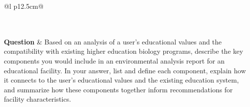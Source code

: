 \begin{longtable}{@{}l p{12.5cm}@{}}
  \caption{Skills per-instance answer comparison ($-25\% < \Delta < 0$) for the 15 most divergent items: same question, each model's answer and reasoning.}\label{tab:cmp_skills_neg0} \\
  \toprule
  \endfirsthead
  \toprule
  \endhead
   \\
  \textbf{Question} & Based on an analysis of a user's educational values and the compatibility with existing higher education biology programs, describe the key components you would include in an environmental analysis report for an educational facility. In your answer, list and define each component, explain how it connects to the user's educational values and the existing education system, and summarize how these components together inform recommendations for facility characteristics. \\

\end{longtable}
